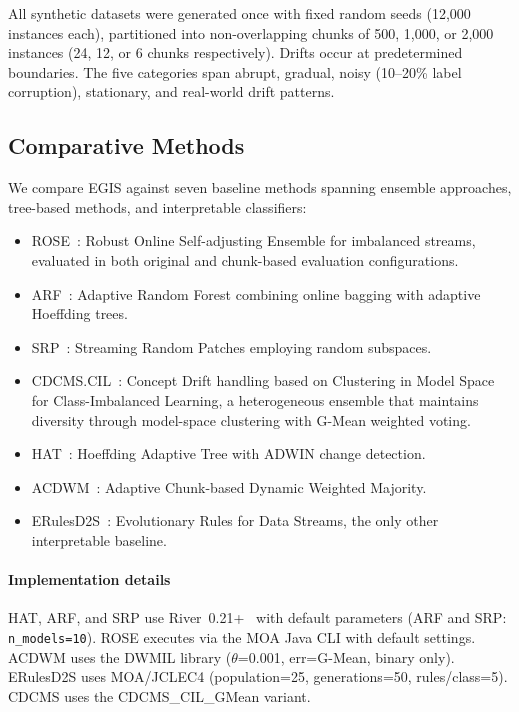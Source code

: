 \documentclass[lettersize,journal]{IEEEtran}
\begin{document}
All synthetic datasets were generated once with fixed random seeds (12,000 instances each), partitioned into non-overlapping chunks of 500, 1,000, or 2,000 instances (24, 12, or 6 chunks respectively). Drifts occur at predetermined boundaries. The five categories span abrupt, gradual, noisy (10--20\% label corruption), stationary, and real-world drift patterns.

\subsection{Comparative Methods}

We compare EGIS against seven baseline methods spanning ensemble approaches, tree-based methods, and interpretable classifiers:

\begin{itemize}
    \item ROSE~\cite{cano2022rose}: Robust Online Self-adjusting Ensemble for imbalanced streams, evaluated in both original and chunk-based evaluation configurations.
    \item ARF~\cite{gomes2017adaptive}: Adaptive Random Forest combining online bagging with adaptive Hoeffding trees.
    \item SRP~\cite{gomes2019streaming}: Streaming Random Patches employing random subspaces.
    \item CDCMS.CIL~\cite{chiu2025cdcms}: Concept Drift handling based on Clustering in Model Space for Class-Imbalanced Learning, a heterogeneous ensemble that maintains diversity through model-space clustering with G-Mean weighted voting.
    \item HAT~\cite{bifet2009adaptive}: Hoeffding Adaptive Tree with ADWIN change detection.
    \item ACDWM~\cite{lu2017adaptive}: Adaptive Chunk-based Dynamic Weighted Majority.
    \item ERulesD2S~\cite{de2019erulesd2s}: Evolutionary Rules for Data Streams, the only other interpretable baseline.
\end{itemize}

\paragraph{Implementation details} HAT, ARF, and SRP use River~0.21+~\cite{montiel2021river} with default parameters (ARF and SRP: \texttt{n\_models=10}). ROSE executes via the MOA Java CLI with default settings. ACDWM uses the DWMIL library ($\theta$=0.001, err=G-Mean, binary only). ERulesD2S uses MOA/JCLEC4 (population=25, generations=50, rules/class=5). CDCMS uses the CDCMS\_CIL\_GMean variant.
\end{document}

